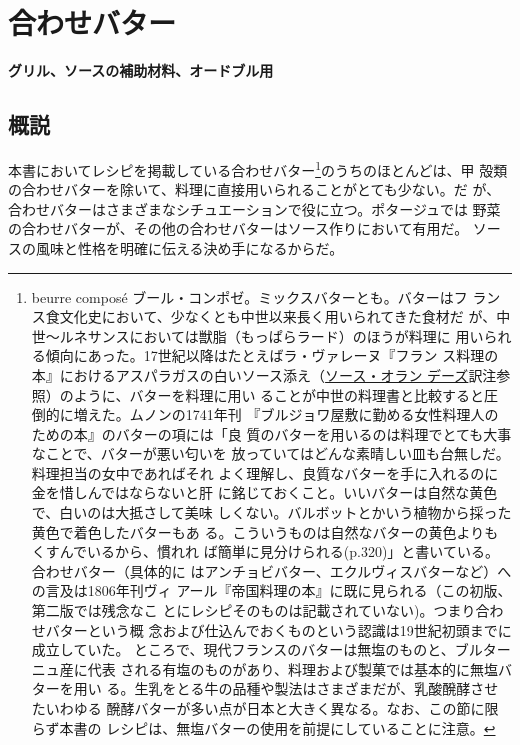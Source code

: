 \hypertarget{beurres-composes}{%
\section{合わせバター}\label{beurres-composes}}

\vspace{-1\zw}
\begin{center}
\textbf{グリル、ソースの補助材料、オードブル用}
\end{center}
\vspace{1\zw}


 

\hypertarget{observation-sur-les-beurres-composes}{%
\subsection{概説}\label{observation-sur-les-beurres-composes}}

本書においてレシピを掲載している合わせバター\footnote{beurre composé
  ブール・コンポゼ。ミックスバターとも。バターはフ
  ランス食文化史において、少なくとも中世以来長く用いられてきた食材だ
  が、中世〜ルネサンスにおいては獣脂（もっぱらラード）のほうが料理に
  用いられる傾向にあった。17世紀以降はたとえばラ・ヴァレーヌ『フラン
  ス料理の本』におけるアスパラガスの白いソース添え（\protect\hyperlink{sauce-hollandaise}{ソース・オラン
  デーズ}訳注参照）のように、バターを料理に用い
  ることが中世の料理書と比較すると圧倒的に増えた。ムノンの1741年刊
  『ブルジョワ屋敷に勤める女性料理人のための本』のバターの項には「良
  質のバターを用いるのは料理でとても大事なことで、バターが悪い匂いを
  放っていてはどんな素晴しい皿も台無しだ。料理担当の女中であればそれ
  よく理解し、良質なバターを手に入れるのに金を惜しんではならないと肝
  に銘じておくこと。いいバターは自然な黄色で、白いのは大抵さして美味
  しくない。バルボットとかいう植物から採った黄色で着色したバターもあ
  る。こういうものは自然なバターの黄色よりもくすんでいるから、慣れれ
  ば簡単に見分けられる(p.320)」と書いている。合わせバター（具体的に
  はアンチョビバター、エクルヴィスバターなど）への言及は1806年刊ヴィ
  アール『帝国料理の本』に既に見られる（この初版、第二版では残念なこ
  とにレシピそのものは記載されていない)。つまり合わせバターという概
  念および仕込んでおくものという認識は19世紀初頭までに成立していた。
  ところで、現代フランスのバターは無塩のものと、ブルターニュ産に代表
  される有塩のものがあり、料理および製菓では基本的に無塩バターを用い
  る。生乳をとる牛の品種や製法はさまざまだが、乳酸醗酵させたいわゆる
  醗酵バターが多い点が日本と大きく異なる。なお、この節に限らず本書の
  レシピは、無塩バターの使用を前提にしていることに注意。}のうちのほとんどは、甲
殻類の合わせバターを除いて、料理に直接用いられることがとても少ない。だ
が、合わせバターはさまざまなシチュエーションで役に立つ。ポタージュでは
野菜の合わせバターが、その他の合わせバターはソース作りにおいて有用だ。
ソースの風味と性格を明確に伝える決め手になるからだ。

